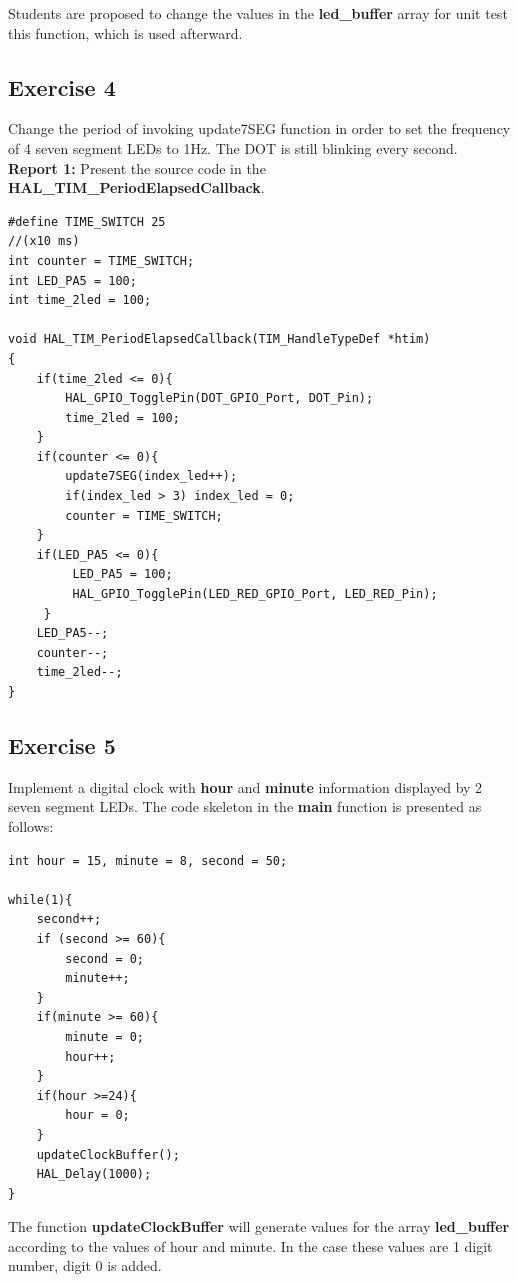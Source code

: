 \documentclass[twoside, final]{hcmut_report}
\begin{document}
Students are proposed to change the values in the \textbf{led\_buffer} array for unit test this function, which is used afterward.

\subsection{Exercise 4}
Change the period of invoking update7SEG function in order to set the frequency of 4 seven segment LEDs to 1Hz. The DOT is still blinking every second.\\


\textbf{Report 1: } Present the source code in the \textbf{HAL\_TIM\_PeriodElapsedCallback}. \\

\begin{lstlisting}[caption=source code in the \textbf{HAL\_TIM\_PeriodElapsedCallback}]
#define TIME_SWITCH 25
//(x10 ms)
int counter = TIME_SWITCH;
int LED_PA5 = 100;
int time_2led = 100;

void HAL_TIM_PeriodElapsedCallback(TIM_HandleTypeDef *htim)
{
	if(time_2led <= 0){
		HAL_GPIO_TogglePin(DOT_GPIO_Port, DOT_Pin);
		time_2led = 100;
	}
	if(counter <= 0){
		update7SEG(index_led++);
		if(index_led > 3) index_led = 0;
		counter = TIME_SWITCH;
	}
	if(LED_PA5 <= 0){
		 LED_PA5 = 100;
		 HAL_GPIO_TogglePin(LED_RED_GPIO_Port, LED_RED_Pin);
	 }
	LED_PA5--;
	counter--;
	time_2led--;
}
\end{lstlisting}

\subsection{Exercise 5}
Implement a digital clock with \textbf{hour} and \textbf {minute} information displayed by 2 seven segment LEDs. The code skeleton in the \textbf{main} function is presented as follows:
\begin{lstlisting}[caption=An example for your source code]
int hour = 15, minute = 8, second = 50;

while(1){
    second++;
    if (second >= 60){
        second = 0;
        minute++;
    }
    if(minute >= 60){
        minute = 0;
        hour++;
    }
    if(hour >=24){
        hour = 0;
    }
    updateClockBuffer();
    HAL_Delay(1000);
}
\end{lstlisting}

The function \textbf{updateClockBuffer} will generate values for the array \textbf{led\_buffer} according to the values of hour and minute. In the case these values are 1 digit number, digit 0 is added. \\
\end{document}
